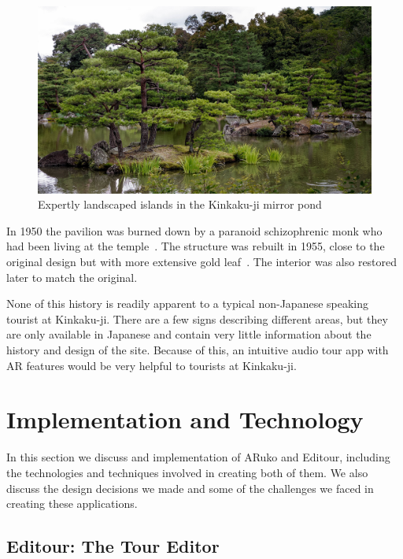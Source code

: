 \documentclass[a4paper, 10pt, american, titlepage]{article}
\begin{document}
\begin{figure}[h]
	\centering
	\includegraphics[width=\textwidth]{kinkakuji-grounds.jpg}
    \caption[Expertly landscaped islands in the Kinkaku-ji mirror pond]{Expertly
		landscaped islands in the Kinkaku-ji mirror pond~\autocite{desousa2014}}
	\label{fig:kinkakujiGrounds}
\end{figure}

In 1950 the pavilion was burned down by a paranoid schizophrenic monk who had
been living at the temple~\autocite{borowitz2005}. The structure was rebuilt in
1955, close to the original design but with more extensive gold
leaf~\autocite{bornoff2000}. The interior was also restored later to match the
original.

None of this history is readily apparent to a typical non-Japanese speaking
tourist at Kinkaku-ji. There are a few signs describing different areas, but
they are only available in Japanese and contain very little information about
the history and design of the site. Because of this, an intuitive audio tour app
with AR features would be very helpful to tourists at Kinkaku-ji.

\clearpage

\section{Implementation and Technology}
\label{sec:implementationAndTechnology}

In this section we discuss and implementation of ARuko and Editour, including
the technologies and techniques involved in creating both of them. We also
discuss the design decisions we made and some of the challenges we faced in
creating these applications.

\subsection{Editour: The Tour Editor}
\label{sec:editour}
\end{document}
